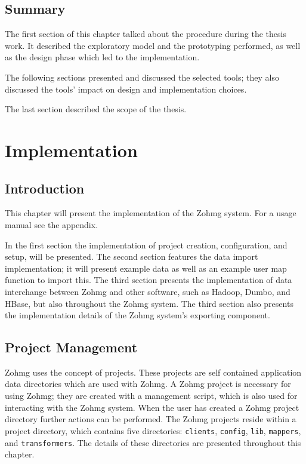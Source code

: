 \section*{Summary}

The first section of this chapter talked about the procedure during the thesis
work. It described the exploratory model and the prototyping performed, as well
as the design phase which led to the implementation.

The following sections presented and discussed the selected tools; they also
discussed the tools' impact on design and implementation choices.

The last section described the scope of the thesis.



\chapter{Implementation}



\section*{Introduction}

This chapter will present the implementation of the Zohmg system. For a usage
manual see the appendix.


In the first section the implementation of project creation, configuration, and
setup, will be presented. The second section features the data import
implementation; it will present example data as well as an example user map
function to import this. The third section presents the implementation of data
interchange between Zohmg and other software, such as Hadoop, Dumbo, and HBase,
but also throughout the Zohmg system. The third section also presents the
implementation details of the Zohmg system's exporting component.


\section{Project Management}

Zohmg uses the concept of projects. These projects are self contained
application data directories which are used with Zohmg. A Zohmg project is
necessary for using Zohmg; they are created with a management script, which is
also used for interacting with the Zohmg system. When the user has created a
Zohmg project directory further actions can be performed. The Zohmg projects
reside within a project directory, which contains five directories:
\texttt{clients}, \texttt{config}, \texttt{lib}, \texttt{mappers}, and
\texttt{transformers}. The details of these directories are presented throughout
this chapter.


